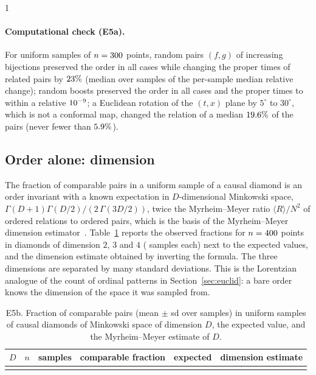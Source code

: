 \documentclass[11pt,a4paper]{article}
\providecommand{\HasLorentz}{0}
\theoremstyle{plain}
\theoremstyle{definition}
\theoremstyle{remark}
\begin{document}
\if\HasLorentz1
\paragraph{Computational check (E5a).}
For \EfiveAtrials{} uniform samples of $n=300$ points, random pairs $(f,g)$ of increasing bijections preserved the order in all \EfiveAconfPreserved{} cases while changing the proper times of related pairs by $23\%$ (median over samples of the per-sample median relative change); random boosts preserved the order in all \EfiveAboostPreserved{} cases and the proper times to within a relative $10^{-9}$; a Euclidean rotation of the $(t,x)$ plane by $5^\circ$ to $30^\circ$, which is not a conformal map, changed the relation of a median $19.6\%$ of the pairs (never fewer than $5.9\%$).

\subsection*{Order alone: dimension}
The fraction of comparable pairs in a uniform sample of a causal diamond is an order invariant with a known expectation in $D$-dimensional Minkowski space, $\Gamma(D+1)\Gamma(D/2)/(2\,\Gamma(3D/2))$, twice the Myrheim--Meyer ratio $\langle R\rangle/N^2$ of ordered relations to ordered pairs, which is the basis of the Myrheim--Meyer dimension estimator~\citep{myrheim1978,meyer1989}. Table~\ref{tab:e5b} reports the observed fractions for $n=400$ points in diamonds of dimension $2$, $3$ and $4$ (\EfiveBreps{} samples each) next to the expected values, and the dimension estimate obtained by inverting the formula. The three dimensions are separated by many standard deviations. This is the Lorentzian analogue of the count of ordinal patterns in Section~\ref{sec:euclid}: a bare order knows the dimension of the space it was sampled from.

\begin{table}[t]
\centering\small
\begin{tabular}{rrrccc}
\toprule
$D$ & $n$ & samples & comparable fraction & expected & dimension estimate\\
\midrule
\\
\bottomrule
\end{tabular}
\caption{E5b. Fraction of comparable pairs (mean $\pm$ sd over samples) in uniform samples of causal diamonds of Minkowski space of dimension $D$, the expected value, and the Myrheim--Meyer estimate of $D$.}
\label{tab:e5b}
\end{table}
\end{document}
